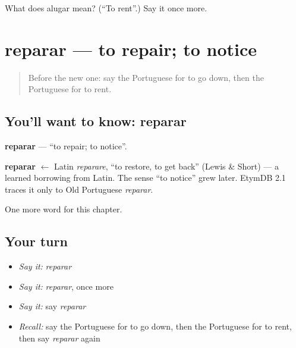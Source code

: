 \begin{tcolorbox}[breakable,colback=teal!4,colframe=teal!35!black,title={Before you move on}]
What does alugar mean? (\textquotedblleft{}To rent\textquotedblright{}.) Say it once more.
\end{tcolorbox}
\section[reparar]{reparar — to repair; to notice}

\label{lesson:PT-C133-reparar}



\begin{quote}
Before the new one: say the Portuguese for to go down, then the Portuguese for to rent.
\end{quote}

\subsection*{You'll want to know: reparar}
\textbf{reparar} — \textquotedblleft{}to repair; to notice\textquotedblright{}.

\begin{cousinweb}
\textbf{reparar} $\leftarrow$ Latin \emph{reparare}, \textquotedblleft{}to restore, to get back\textquotedblright{} (Lewis \& Short) — a learned borrowing from Latin. The sense \textquotedblleft{}to notice\textquotedblright{} grew later. EtymDB 2.1 traces it only to Old Portuguese \emph{reparar}.
\end{cousinweb}

\begin{grammarlens}[title={What you've built}]
One more word for this chapter.
\end{grammarlens}

\subsection*{Your turn}
\begin{itemize}
\raggedright
  \item \emph{Say it:} \emph{reparar}
  \item \emph{Say it:} \emph{reparar}, once more
  \item \emph{Say it:} say \emph{reparar}
  \item \emph{Recall:} say the Portuguese for to go down, then the Portuguese for to rent, then say \emph{reparar} again
\end{itemize}

